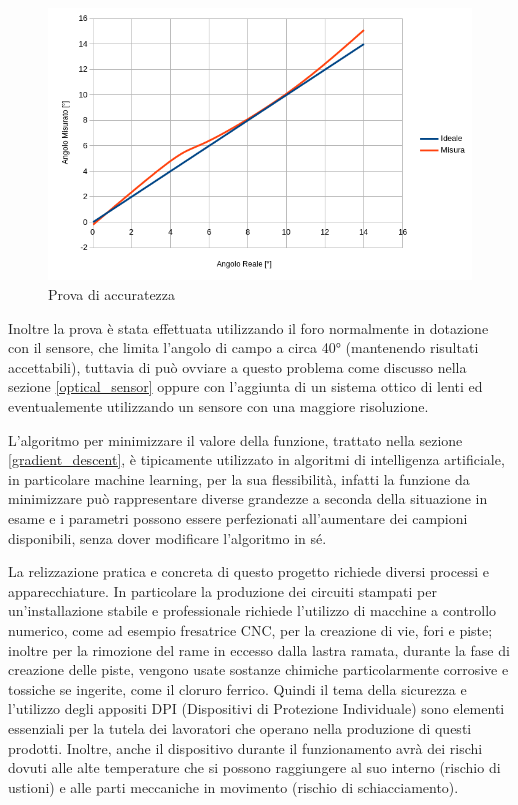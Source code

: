 \documentclass[12pt]{article}
\begin{document}
    \begin{figure}[h]
    \centering
        \includegraphics[width=\textwidth-50pt]{Draws/Accuracy_test.png}
        \caption{Prova di accuratezza}
        \label{accuracy_test}
    \end{figure}
     
    Inoltre la prova è stata effettuata utilizzando il foro normalmente in dotazione con il sensore, che limita l'angolo di campo a circa 40° (mantenendo risultati accettabili), tuttavia di può ovviare a questo problema come discusso nella sezione \ref{optical_sensor} oppure con l'aggiunta di un sistema ottico di lenti ed eventualemente utilizzando un sensore con una maggiore risoluzione.
    
    \vspace{1cm}
    L'algoritmo per minimizzare il valore della funzione, trattato nella sezione \ref{gradient_descent}, è tipicamente utilizzato in algoritmi di intelligenza artificiale, in particolare machine learning, per la sua flessibilità, infatti la funzione da minimizzare può rappresentare diverse grandezze a seconda della situazione in esame e i parametri possono essere perfezionati all'aumentare dei campioni disponibili, senza dover modificare l'algoritmo in sé.
    
    \newpage
    La relizzazione pratica e concreta di questo progetto richiede diversi processi e apparecchiature. In particolare la produzione dei circuiti stampati per un'installazione stabile e professionale richiede l'utilizzo di macchine a controllo numerico, come ad esempio fresatrice CNC, per la creazione di vie, fori e piste; inoltre per la rimozione del rame in eccesso dalla lastra ramata, durante la fase di creazione delle piste, vengono usate sostanze chimiche particolarmente corrosive e tossiche se ingerite, come il cloruro ferrico. Quindi il tema della sicurezza e l'utilizzo degli appositi DPI (Dispositivi di Protezione Individuale) sono elementi essenziali per la tutela dei lavoratori che operano nella produzione di questi prodotti. Inoltre, anche il dispositivo durante il funzionamento avrà dei rischi dovuti alle alte temperature che si possono raggiungere al suo interno (rischio di ustioni) e alle parti meccaniche in movimento (rischio di schiacciamento).
    
    \vfill
    \let\thefootnote\relax{}
\end{document}
